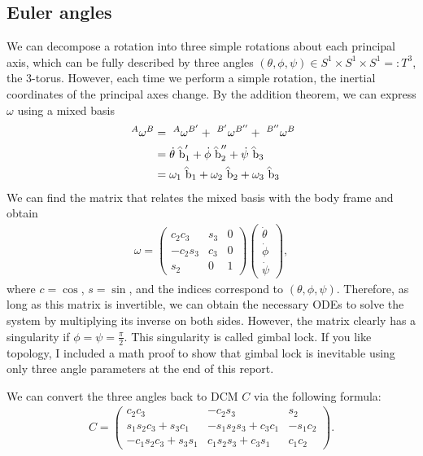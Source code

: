 \documentclass[12pt]{article}
\begin{document}
\subsection{Euler angles}
We can decompose a rotation into three simple rotations about each principal axis, which can be fully described by three angles $ (\theta,\phi,\psi) \in S^{1}\times S^{1} \times S^{1} =:T^{3}$, the 3-torus. However, each time we perform a simple rotation, the inertial coordinates of the principal axes change. By the addition theorem, we can express $ \omega$ using a mixed basis
\begin{align*}
	\ ^A\omega^B &= \ ^A \omega^{B'} + \ ^{B'} \omega^{B''} + \ ^{B''} \omega^{B} \\
	&= \dot{\theta} \wh{ b}_1' + \dot{\phi} \wh{ b}_2'' + \dot{\psi} \wh{ b}_3\\
	&= \omega_1 \wh{ b}_1 + \omega_2 \wh{ b}_2 + \omega_3 \wh{ b}_3 
\end{align*}
We can find the matrix that relates the mixed basis with the body frame and obtain
\begin{align*}
	\omega = \begin{pmatrix} c_2 c_3 & s_3 & 0\\ -c_2s_3 & c_3 &0\\ s_2&0&1 \end{pmatrix} \begin{pmatrix} \dot{\theta}\\ \dot{\phi}\\ \dot{\psi} \end{pmatrix} ,
\end{align*}
where $ c = \cos$, $ s= \sin$, and the indices correspond to $ (\theta,\phi,\psi)$. Therefore, as long as this matrix is invertible, we can obtain the necessary ODEs to solve the system by multiplying its inverse on both sides. However, the matrix clearly has a singularity if $ \phi = \psi = \frac{\pi}{2}$. This singularity is called gimbal lock. If you like topology, I included a math proof to show that gimbal lock is inevitable using only three angle parameters at the end of this report.

We can convert the three angles back to DCM $ C$ via the following formula:
 \begin{align*}
	 C = \begin{pmatrix} c_2c_3&-c_2s_3&s_2\\s_1s_2c_3+s_3c_1&-s_1s_2s_3+c_3c_1&-s_1 c_2\\ -c_1s_2c_3+s_3s_1&c_1s_2s_3+c_3s_1&c_1c_2 \end{pmatrix} .
\end{align*}
\end{document}
